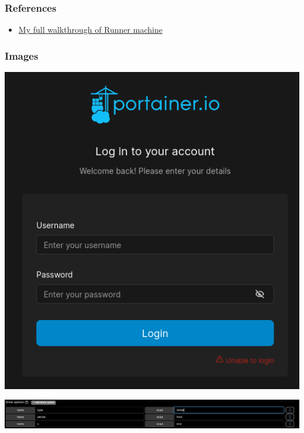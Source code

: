 \documentclass[a4paper]{article}
\def\tightlist{}
\begin{document}
    
          \subsubsection{References}

      \begin{itemize}
\tightlist
\item
  \href{https://github.com/alstephh/This_Is_Just_A_Hobby/tree/main/MACHINES/HTB/Runner}{My full walkthrough of Runner machine}
\end{itemize}

    
          \subsubsection{Images}
      
              \begin{minipage}[c]{\textwidth}
          \centering
          \includegraphics[width=\textwidth]{src/issues/4 - RUNNER/issue41.png}
          \label{4:RUNNER:issue.md:issue41.png}
          \vspace{4ex}
        \end{minipage}
              \begin{minipage}[c]{\textwidth}
          \centering
          \includegraphics[width=\textwidth]{src/issues/4 - RUNNER/issue42.png}
          \label{4:RUNNER:issue.md:issue42.png}
          \vspace{4ex}
        \end{minipage}
\end{document}
